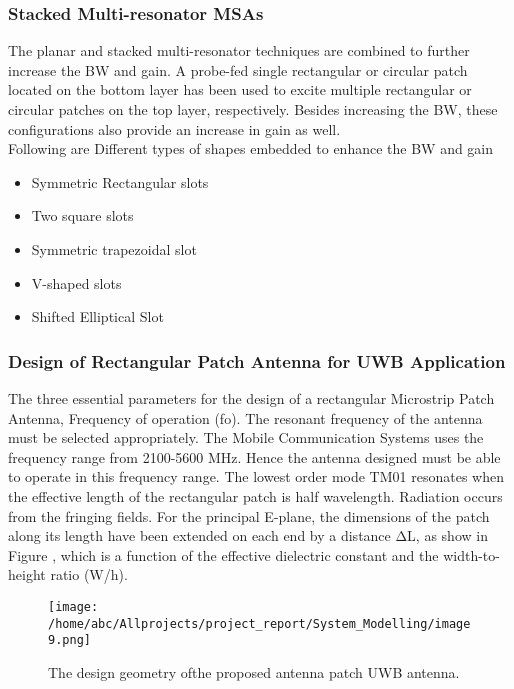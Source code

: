 \documentclass[12pt]{article}
\begin{document}
				            \subsubsection{ Stacked Multi-resonator MSAs}
				              \justify
				                The planar and stacked multi-resonator techniques are combined to further increase the BW and gain. A probe-fed single rectangular or circular patch located on the bottom layer has been used to excite multiple rectangular or circular patches on the top layer, respectively. Besides increasing the BW, these configurations also provide an increase in gain as well. \\
				                

	   		                	Following are Different types of shapes embedded to enhance the BW and gain 
	   		                	
				                \begin{itemize}

				                	\item Symmetric Rectangular slots
				                	\item Two square slots 
				                	\item Symmetric trapezoidal slot 
				                	\item V-shaped slots
				                	\item Shifted Elliptical Slot
				                	
				                \end{itemize}
				               \subsubsection{ Design of  Rectangular Patch Antenna for UWB Application}
				                \justify
				                 The three essential parameters for the design of a rectangular Microstrip Patch Antenna, Frequency of operation (fo). The resonant frequency of the antenna must be selected appropriately. The Mobile Communication Systems uses the frequency range from 2100-5600 MHz. Hence the antenna designed must be able to operate in this frequency range. The lowest order mode TM01 resonates when the effective length of the rectangular patch is half wavelength. Radiation occurs from the fringing fields. For the principal E-plane, the dimensions of the patch along its length have been extended on each end by a distance ΔL, as show in Figure , which is a function of the effective dielectric constant and the width-to-height ratio (W/h).
				                  \begin{figure}
				                  	\centering
				                  	\texttt{[image: /home/abc/Allprojects/project\_report/System\_Modelling/image9.png]}
				                  	\caption{The design geometry ofthe proposed antenna patch UWB antenna.}	             	
				                  \end{figure}
				                  
\end{document}
